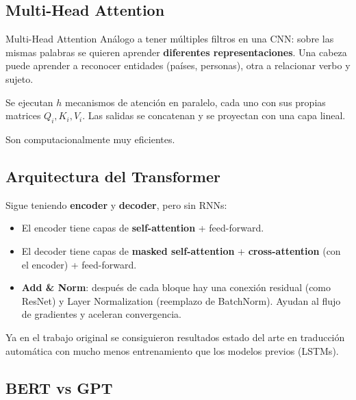 \documentclass[12pt, a4paper]{article}
\begin{document}
\subsection{Multi-Head Attention}

\begin{defbox}{Multi-Head Attention}
	Análogo a tener múltiples filtros en una CNN: sobre las mismas palabras se quieren aprender \textbf{diferentes representaciones}. Una cabeza puede aprender a reconocer entidades (países, personas), otra a relacionar verbo y sujeto.

	Se ejecutan $h$ mecanismos de atención en paralelo, cada uno con sus propias matrices $Q_i, K_i, V_i$. Las salidas se concatenan y se proyectan con una capa lineal.

	Son computacionalmente muy eficientes.
\end{defbox}

\subsection{Arquitectura del Transformer}

Sigue teniendo \textbf{encoder} y \textbf{decoder}, pero sin RNNs:
\begin{itemize}
	\item El encoder tiene capas de \textbf{self-attention} + feed-forward.
	\item El decoder tiene capas de \textbf{masked self-attention} + \textbf{cross-attention} (con el encoder) + feed-forward.
	\item \textbf{Add \& Norm}: después de cada bloque hay una conexión residual (como ResNet) y Layer Normalization (reemplazo de BatchNorm). Ayudan al flujo de gradientes y aceleran convergencia.
\end{itemize}

Ya en el trabajo original se consiguieron resultados estado del arte en traducción automática con mucho menos entrenamiento que los modelos previos (LSTMs).

\subsection{BERT vs GPT}
\end{document}
